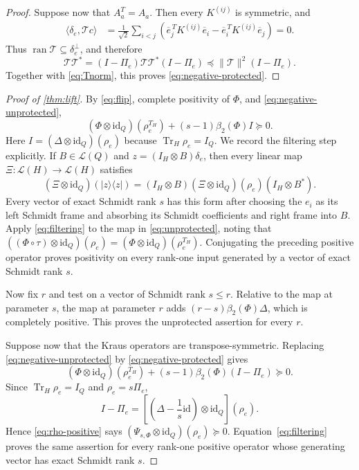 \documentclass[11pt,reqno]{amsart}
\theoremstyle{remark}
\DeclareMathOperator{\Tr}{Tr}
\DeclareMathOperator{\ran}{ran}
\newcommand{\id}{\mathrm{id}}
\newcommand{\cL}{\mathcal L}
\newcommand{\ip}[2]{\langle #1,#2\rangle}
\newcommand{\norm}[1]{\lVert #1\rVert}
\newcommand{\ketbra}[2]{\lvert #1\rangle\!\langle #2\rvert}
\newcommand{\succeqop}{\mathrel{\succeq}}
\newcommand{\preceqop}{\mathrel{\preceq}}
\begin{document}
\begin{proof}
Suppose now that $A_a^T=A_a$.  Then every $K^{(ij)}$ is symmetric, and
\begin{align*}
  \ip{\delta_e}{\mathcal Tc}
  &=
  \frac1{\sqrt2}\sum_{i<j}
   \left(
     \overline e_j^{\,T}K^{(ij)}\overline e_i
     -\overline e_i^{\,T}K^{(ij)}\overline e_j
   \right)=0.
\end{align*}
Thus $\ran\mathcal T\subseteq\delta_e^\perp$, and therefore
\[
  \mathcal T\mathcal T^*
  =(I-\Pi_e)\mathcal T\mathcal T^*(I-\Pi_e)
  \preceqop\norm{\mathcal T}^2(I-\Pi_e).
\]
Together with \cref{eq:Tnorm}, this proves
\cref{eq:negative-protected}.
\end{proof}

\begin{proof}[Proof of \cref{thm:lift}]
By \cref{eq:flip}, complete positivity of $\Phi$, and
\cref{eq:negative-unprotected},
\[
  (\Phi\otimes\id_Q)(\rho_e^{T_H})
  +(s-1)\beta_2(\Phi)I\succeqop0.
\]
Here
$I=(\Delta\otimes\id_Q)(\rho_e)$ because
$\Tr_H\rho_e=I_Q$.  We record the filtering step explicitly.  If
$B\in\cL(Q)$ and $z=(I_H\otimes B)\delta_e$, then every linear map
$\Xi:\cL(H)\to\cL(H)$ satisfies
\begin{equation}
\label{eq:filtering}
  (\Xi\otimes\id_Q)(\ketbra{z}{z})
  =(I_H\otimes B)(\Xi\otimes\id_Q)(\rho_e)(I_H\otimes B^*).
\end{equation}
Every vector of exact Schmidt rank $s$ has this form after choosing the
$e_i$ as its left Schmidt frame and absorbing its Schmidt coefficients and
right frame into $B$.  Apply \cref{eq:filtering} to the map in
\cref{eq:unprotected}, noting that
$((\Phi\circ\tau)\otimes\id_Q)(\rho_e)
=(\Phi\otimes\id_Q)(\rho_e^{T_H})$.  Conjugating the preceding positive
operator proves positivity on every rank-one input generated by a vector of
exact Schmidt rank $s$.

Now fix $r$ and test on a vector of Schmidt rank $s\le r$.  Relative to the
map at parameter $s$, the map at parameter $r$ adds
$(r-s)\beta_2(\Phi)\Delta$, which is completely positive.  This proves the
unprotected assertion for every $r$.

Suppose now that the Kraus operators are transpose-symmetric.  Replacing
\cref{eq:negative-unprotected} by \cref{eq:negative-protected} gives
\begin{equation}
\label{eq:rho-positive}
  (\Phi\otimes\id_Q)(\rho_e^{T_H})
  +(s-1)\beta_2(\Phi)(I-\Pi_e)\succeqop0.
\end{equation}
Since $\Tr_H\rho_e=I_Q$ and $\rho_e=s\Pi_e$,
\[
  I-\Pi_e
  =
  \left[\left(\Delta-\frac1s\id\right)\otimes\id_Q\right](\rho_e).
\]
Hence \cref{eq:rho-positive} says
$(\Psi_{s,\Phi}\otimes\id_Q)(\rho_e)\succeqop0$.
Equation~\eqref{eq:filtering} proves the same assertion for every rank-one
positive operator whose generating vector has exact Schmidt rank $s$.


\end{proof}
\end{document}
